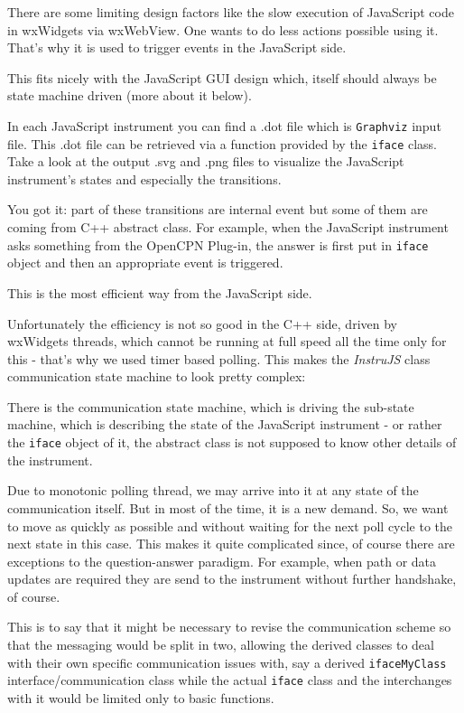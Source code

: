 \documentclass[11pt]{article}
\begin{document}
    There are some limiting design factors like the slow execution of
JavaScript code in wxWidgets via wxWebView. One wants to do less actions
possible using it. That's why it is used to trigger events in the
JavaScript side.

    This fits nicely with the JavaScript GUI design which, itself should
always be state machine driven (more about it below).

    In each JavaScript instrument you can find a .dot file which is
\texttt{Graphviz} input file. This .dot file can be retrieved via a
function provided by the \texttt{iface} class. Take a look at the output
.svg and .png files to visualize the JavaScript instrument's states and
especially the transitions.

    You got it: part of these transitions are internal event but some of
them are coming from C++ abstract class. For example, when the
JavaScript instrument asks something from the OpenCPN Plug-in, the
answer is first put in \texttt{iface} object and then an appropriate
event is triggered.

    This is the most efficient way from the JavaScript side.

    Unfortunately the efficiency is not so good in the C++ side, driven by
wxWidgets threads, which cannot be running at full speed all the time
only for this - that's why we used timer based polling. This makes the
\emph{InstruJS} class communication state machine to look pretty
complex:

    There is the communication state machine, which is driving the sub-state
machine, which is describing the state of the JavaScript instrument - or
rather the \texttt{iface} object of it, the abstract class is not
supposed to know other details of the instrument.

    Due to monotonic polling thread, we may arrive into it at any state of
the communication itself. But in most of the time, it is a new demand.
So, we want to move as quickly as possible and without waiting for the
next poll cycle to the next state in this case. This makes it quite
complicated since, of course there are exceptions to the question-answer
paradigm. For example, when path or data updates are required they are
send to the instrument without further handshake, of course.

    This is to say that it might be necessary to revise the communication
scheme so that the messaging would be split in two, allowing the derived
classes to deal with their own specific communication issues with, say a
derived \texttt{ifaceMyClass} interface/communication class while the
actual \texttt{iface} class and the interchanges with it would be
limited only to basic functions.
\end{document}
